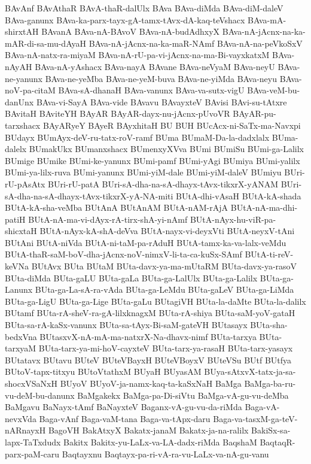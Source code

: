 {BAvAnf
BAvAthaR
BAvA-thaR-dalUlx
BAva
BAva-diMda
BAva-diM-daleV
BAva-ganunx
BAva-ka-parx-tayx-gA-tamx-tAvx-dA-kaq-teVshacx
BAva-mA-shirxtAH
BAvanA
BAva-nA-BAvoV
BAva-nA-budAdhxyX
BAva-nA-jAcnx-na-ka-mAR-di-sa-mu-dAyaH
BAva-nA-jAcnx-na-ka-maR-NAmf
BAva-nA-na-peVkoSxV
BAva-nA-natx-ra-miyaM
BAva-nA-rU-pa-vi-jAcnx-na-ma-Bi-vayxkatxM
BAva-nAyAH
BAva-nA-yAshacx
BAva-nayA
BAvane
BAva-neVyaM
BAva-neyU
BAva-ne-yanunx
BAva-ne-yeMba
BAva-ne-yeM-buva
BAva-ne-yiMda
BAva-neyu
BAva-noV-pa-citaM
BAva-sA-dhanaH
BAva-vanunx
BAva-va-sutx-vigU
BAva-veM-bu-danUnx
BAva-vi-SayA
BAva-vide
BAvavu
BAvayxteV
BAvisi
BAvi-su-tAtxre
BAvitaH
BAviteYH
BAyAR
BAyAR-dayx-nu-jAcnx-pUvoVR
BAyAR-pu-tarxshacx
BAyARyeY
BAyeR
BAyxhitaH
BU
BUH
BUcAcx-ni-SaTx-ma-Navxpi
BUdayx
BUmAyx-deV-ru-tatx-roV-ramf
BUma
BUmaM-Da-la-dadxlalx
BUma-dalelx
BUmakUkx
BUmanxshacx
BUmenxyXVva
BUmi
BUmiSu
BUmi-ga-Lalilx
BUmige
BUmike
BUmi-ke-yanunx
BUmi-pamf
BUmi-yAgi
BUmiya
BUmi-yalilx
BUmi-ya-lilx-ruva
BUmi-yanunx
BUmi-yiM-dale
BUmi-yiM-daleV
BUmiyu
BUri-rU-pAsAtx
BUri-rU-patA
BUri-sA-dha-na-sA-dhayx-tAvx-tikxrX-yANAM
BUri-sA-dha-na-sA-dhayx-tAvx-tikxrX-yA-NA-miti
BUtA-dhi-vAsaH
BUtA-kA-shada
BUtA-kA-sha-veMba
BUtAnA
BUtAnAM
BUtA-nAM-rAjA
BUtA-nA-ma-dhi-patiH
BUtA-nA-ma-vi-dAyx-rA-tirx-shA-yi-nAmf
BUtA-nAyx-hu-viR-pa-shicxtaH
BUtA-nAyx-kA-shA-deVva
BUtA-nayx-vi-deyxVti
BUtA-neyxV-tAni
BUtAni
BUtA-niVda
BUtA-ni-taM-pa-rAduH
BUtA-tamx-ka-va-lalx-veMdu
BUtA-thaR-saM-boV-dha-jAcnx-noV-nimxV-li-ta-ca-kuSx-SAmf
BUtA-ti-reV-keVNa
BUtAvx
BUta
BUtaM
BUta-davx-ya-ma-mUtaRM
BUta-davx-ya-rasoV
BUta-diMda
BUta-gaLU
BUta-gaLa
BUta-ga-LalUlx
BUta-ga-Lalilx
BUta-ga-Lanunx
BUta-ga-La-sA-ra-vAda
BUta-ga-LeMdu
BUta-gaLeV
BUta-ga-LiMda
BUta-ga-LigU
BUta-ga-Lige
BUta-gaLu
BUtagiVH
BUta-la-daMte
BUta-la-dalilx
BUtamf
BUta-rA-sheV-ra-gA-lilxknagxM
BUta-rA-shiya
BUta-saM-yoV-gataH
BUta-sa-rA-kaSx-vanunx
BUta-sa-tAyx-Bi-saM-gateVH
BUtasayx
BUta-sha-bedxVna
BUtasxvX-nA-mA-ma-natxrX-Na-dhavx-nimf
BUta-tarxya
BUta-tarxyaM
BUta-tarx-ya-mi-hoV-cayxteV
BUta-tarx-ya-rasaH
BUta-tarx-yasayx
BUtatavx
BUtavu
BUteV
BUteVBayxH
BUteVBoyxV
BUteVSu
BUtf
BUtfya
BUtoV-tapx-titxyu
BUtoVtathxM
BUyaH
BUyasAM
BUya-sAtxvX-tatx-ja-sa-shocxVSaNxH
BUyoV
BUyoV-ja-namx-kaq-ta-kaSxNaH
BaMga
BaMga-ba-ru-vu-deM-bu-danunx
BaMgakekx
BaMga-pa-Di-siVtu
BaMga-vA-gu-vu-deMba
BaMgavu
BaNayx-tAmf
BaNayxteV
Baganx-vA-gu-vu-da-riMda
Baga-vA-nevxVda
Baga-vAnf
Baga-vaM-tana
Baga-va-tApx-daru
Baga-va-tasxM-ga-teV-nARnayxH
BagoVH
BakAtxyX
Bakatx-janaM
Bakatx-ja-na-ralilx
BakiSx-sa-lapx-TaTxdudx
Bakitx
Bakitx-yu-LaLx-va-LA-dadx-riMda
BaqshaM
BaqtaqR-parx-paM-caru
Baqtayxnu
Baqtayx-pa-ri-vA-ra-vu-LaLx-va-nA-gu-vanu
}

